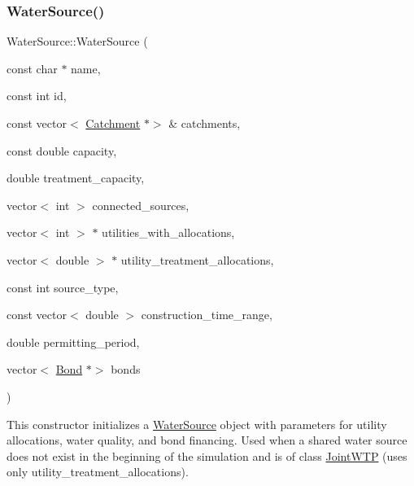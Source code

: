 \subsubsection{\texorpdfstring{Water\+Source()}{WaterSource()}\hspace{0.1cm}{\footnotesize\ttfamily [6/8]}}
{\footnotesize\ttfamily Water\+Source\+::\+Water\+Source (\begin{DoxyParamCaption}\item[{const char $\ast$}]{name,  }\item[{const int}]{id,  }\item[{const vector$<$ \mbox{\hyperlink{classCatchment}{Catchment}} $\ast$$>$ \&}]{catchments,  }\item[{const double}]{capacity,  }\item[{double}]{treatment\+\_\+capacity,  }\item[{vector$<$ int $>$}]{connected\+\_\+sources,  }\item[{vector$<$ int $>$ $\ast$}]{utilities\+\_\+with\+\_\+allocations,  }\item[{vector$<$ double $>$ $\ast$}]{utility\+\_\+treatment\+\_\+allocations,  }\item[{const int}]{source\+\_\+type,  }\item[{const vector$<$ double $>$}]{construction\+\_\+time\+\_\+range,  }\item[{double}]{permitting\+\_\+period,  }\item[{vector$<$ \mbox{\hyperlink{classBond}{Bond}} $\ast$$>$}]{bonds }\end{DoxyParamCaption})}



This constructor initializes a {\ttfamily \mbox{\hyperlink{classWaterSource}{Water\+Source}}} object with parameters for utility allocations, water quality, and bond financing. Used when a shared water source does not exist in the beginning of the simulation and is of class {\ttfamily \mbox{\hyperlink{classJointWTP}{Joint\+W\+TP}}} (uses only {\ttfamily utility\+\_\+treatment\+\_\+allocations}). 


